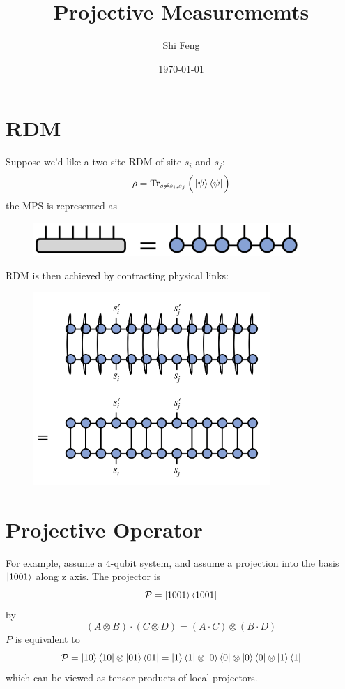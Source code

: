 \documentclass[11pt]{article}
\title{Projective Measurememts}
\author{Shi Feng}
\date{\today}
\theoremstyle{remark}
\theoremstyle{definition}
\numberwithin{thm}{section}
\begin{document}
\maketitle
\section{RDM}
Suppose we'd like a two-site RDM of site $s_i$ and  $s_j$:
\begin{equation}
	\rho = \Tr_{s\neq s_i, s_j}\Big(\ket{\psi}\bra{\psi}\Big)
\end{equation}
the MPS is represented as
\begin{figure}[h]
	\centering
	\includegraphics[width=0.9\textwidth]{mpstt_diagram.png}
\end{figure}

RDM is then achieved by contracting physical links:
\begin{figure}[h]
	\centering
	\includegraphics[width=0.8\textwidth]{two_rdm.png}
\end{figure}


\section{Projective Operator}
For example, assume a 4-qubit system, and assume a projection into the basis $\ket{1001}$ along z axis. The projector is
\begin{equation}
	\mathcal{P} = \ket{1001}\bra{1001}
\end{equation}
by
\begin{equation}
	(A\otimes B)\cdot(C\otimes D) = (A\cdot C)\otimes(B\cdot D)
\end{equation}
$P$ is equivalent to
\begin{equation}
	\mathcal{P} = \ket{10}\bra{10}\otimes \ket{01}\bra{01} = \ket{1}\bra{1}\otimes \ket{0}\bra{0} \otimes \ket{0} \bra{0} \otimes \ket{1}\bra{1}
\end{equation}
which can be viewed as tensor products of local projectors. 
\end{document}
